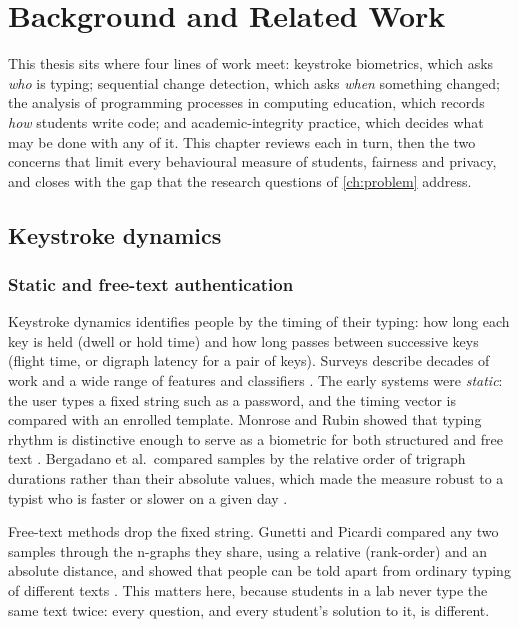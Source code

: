 \chapter{Background and Related Work}
\label{ch:background}

This thesis sits where four lines of work meet: keystroke biometrics, which
asks \emph{who} is typing; sequential change detection, which asks
\emph{when} something changed; the analysis of programming processes in
computing education, which records \emph{how} students write code; and
academic-integrity practice, which decides what may be done with any of it.
This chapter reviews each in turn, then the two concerns that limit every
behavioural measure of students, fairness and privacy, and closes with the gap
that the research questions of \cref{ch:problem} address.

\section{Keystroke dynamics}
\label{sec:rw-keystroke}

\subsection{Static and free-text authentication}
Keystroke dynamics identifies people by the timing of their typing: how long
each key is held (dwell or hold time) and how long passes between successive
keys (flight time, or digraph latency for a pair of keys). Surveys describe
decades of work and a wide range of features and classifiers
\cite{banerjee2012survey,teh2013survey}. The early systems were \emph{static}:
the user types a fixed string such as a password, and the timing vector is
compared with an enrolled template. Monrose and Rubin showed that typing
rhythm is distinctive enough to serve as a biometric for both structured and
free text \cite{monrose2000keystroke}. Bergadano et al.\ compared samples by
the relative order of trigraph durations rather than their absolute values,
which made the measure robust to a typist who is faster or slower on a given
day \cite{bergadano2002keystroke}.

Free-text methods drop the fixed string. Gunetti and Picardi compared any two
samples through the n-graphs they share, using a relative (rank-order) and an
absolute distance, and showed that people can be told apart from ordinary
typing of different texts \cite{gunetti2005freetext}. This matters here,
because students in a lab never type the same text twice: every question, and
every student's solution to it, is different.


